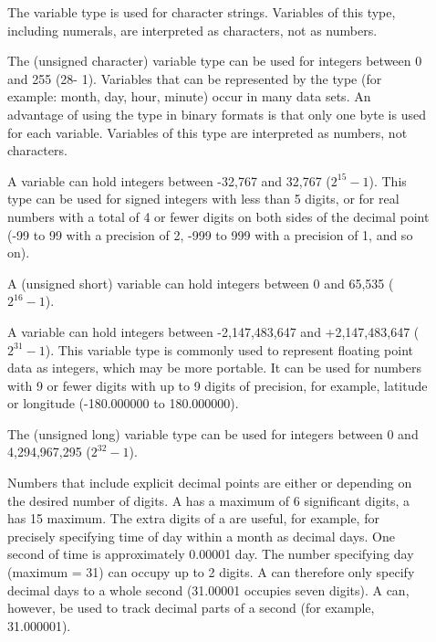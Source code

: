 \begin{description}
\item[]
  
  The  variable type is used for character strings.
  Variables of this type, including numerals, are interpreted as
  characters, not as numbers.

\item[]
  
  The  (unsigned character) variable type can be used for
  integers between 0 and 255 (28- 1). Variables that can be
  represented by the  type (for example: month, day, hour,
  minute) occur in many data sets. An advantage of using the 
  type in binary formats is that only one byte is used for each
  variable. Variables of this type are interpreted as numbers, not
  characters.

\item[]
  
  A  variable can hold integers between -32,767 and 32,767
  ($2^{15}- 1$). This type can be used for signed integers with less
  than 5 digits, or for real numbers with a total of 4 or fewer digits
  on both sides of the decimal point (-99 to 99 with a precision of 2,
  -999 to 999 with a precision of 1, and so on).

\item[]
  
  A  (unsigned short) variable can hold integers between 0
  and 65,535 ($2^{16} - 1$).

\item[]
  
  A  variable can hold integers between -2,147,483,647 and
  +2,147,483,647 ($2^{31} - 1$). This variable type is commonly used
  to represent floating point data as integers, which may be more
  portable. It can be used for numbers with 9 or fewer digits with up
  to 9 digits of precision, for example, latitude or longitude
  (-180.000000 to 180.000000).

\item[]
  
  The  (unsigned long) variable type can be used for
  integers between 0 and 4,294,967,295 ($2^{32} - 1$).

\item[]
  
  Numbers that include explicit decimal points are either 
  or  depending on the desired number of digits. A
   has a maximum of 6 significant digits, a 
  has 15 maximum. The extra digits of a  are useful, for
  example, for precisely specifying time of day within a month as
  decimal days. One second of time is approximately 0.00001 day. The
  number specifying day (maximum = 31) can occupy up to 2 digits. A
   can therefore only specify decimal days to a whole
  second (31.00001 occupies seven digits). A  can,
  however, be used to track decimal parts of a second (for example,
  31.000001).


\end{description}
